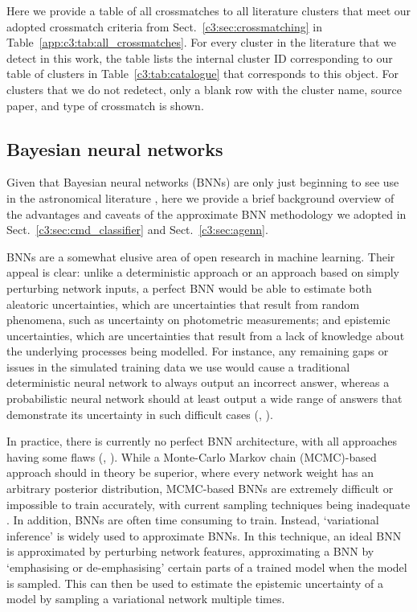 Here we provide a table of all crossmatches to all literature clusters that meet our adopted crossmatch criteria from Sect.~\ref{c3:sec:crossmatching} in Table~\ref{app:c3:tab:all_crossmatches}. For every cluster in the literature that we detect in this work, the table lists the internal cluster ID corresponding to our table of clusters in Table~\ref{c3:tab:catalogue} that corresponds to this object. For clusters that we do not redetect, only a blank row with the cluster name, source paper, and type of crossmatch is shown.


\subsection{Bayesian neural networks}\label{app:c3:bayesian_nets}

Given that Bayesian neural networks (BNNs) are only just beginning to see use in the astronomical literature \citep[e.g.][]{huertas-company_hubble_2019}, here we provide a brief background overview of the advantages and caveats of the approximate BNN methodology we adopted in Sect.~\ref{c3:sec:cmd_classifier} and Sect.~\ref{c3:sec:agenn}.

BNNs are a somewhat elusive area of open research in machine learning. Their appeal is clear: unlike a deterministic approach or an approach based on simply perturbing network inputs, a perfect BNN would be able to estimate both aleatoric uncertainties, which are uncertainties that result from random phenomena, such as uncertainty on photometric measurements; and epistemic uncertainties, which are uncertainties that result from a lack of knowledge about the underlying processes being modelled. For instance, any remaining gaps or issues in the simulated training data we use would cause a traditional deterministic neural network to always output an incorrect answer, whereas a probabilistic neural network should at least output a wide range of answers that demonstrate its uncertainty in such difficult cases (\cite{goan_bayesian_2020}, \cite{jospin_hands-bayesian_2022}).

In practice, there is currently no perfect BNN architecture, with all approaches having some flaws (\cite{goan_bayesian_2020}, \cite{jospin_hands-bayesian_2022}). While a Monte-Carlo Markov chain (MCMC)-based approach should in theory be superior, where every network weight has an arbitrary posterior distribution, MCMC-based BNNs are extremely difficult or impossible to train accurately, with current sampling techniques being inadequate \citep{goan_bayesian_2020}. In addition, BNNs are often time consuming to train. Instead, `variational inference' is widely used to approximate BNNs. In this technique, an ideal BNN is approximated by perturbing network features, approximating a BNN by `emphasising or de-emphasising' certain parts of a trained model when the model is sampled. This can then be used to estimate the epistemic uncertainty of a model by sampling a variational network multiple times.

